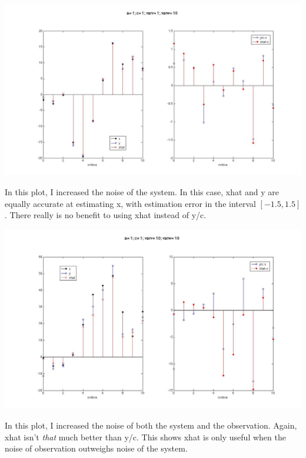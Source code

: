 \documentclass[leqno]{article}
\begin{document}
\begin{center}\includegraphics[scale=0.25]{fig9}\end{center}
In this plot, I increased the noise of the system. In this case, xhat and y are equally accurate at estimating x, with estimation error in the interval $[-1.5,1.5]$. There really is no benefit to using xhat instead of y/c.

\begin{center}\includegraphics[scale=0.3]{fig10}\end{center}
In this plot, I increased the noise of both the system and the observation. Again, xhat isn't \textit{that} much better than y/c. This shows xhat is only useful when the noise of observation outweighs noise of the system.
\end{document}
